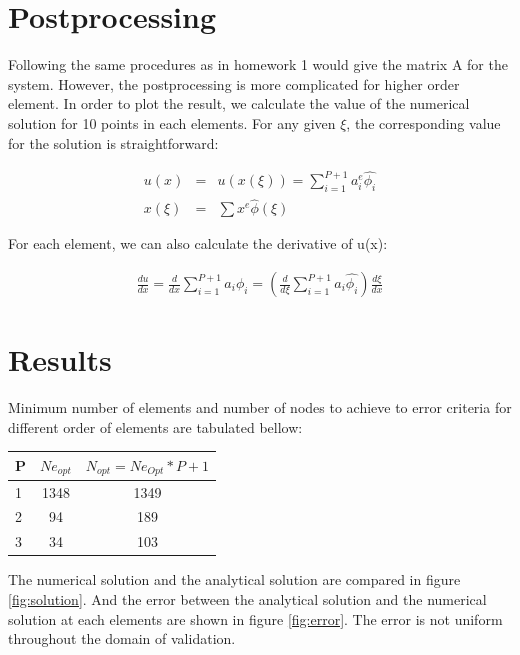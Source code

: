 \documentclass[paper=a4, fontsize=11pt]{article} %
\begin{document}
\section{Postprocessing}
Following the same procedures as in homework 1 would give the matrix A for the system. However, the postprocessing is more complicated for higher order element. In order to plot the result, we calculate the value of the numerical solution for 10 points in each elements. For any given $\xi$, the corresponding value for the solution is straightforward:

\begin{eqnarray}
 u(x) &=& u(x(\xi))=\sum_{i=1}^{P+1} a_i^e \hat{\phi_i}\nonumber\\
 x(\xi) &=& \sum x^e \hat{\phi}(\xi)
 \end{eqnarray} 

For each element, we can also calculate the derivative of u(x):

\begin{eqnarray}
\frac{du}{dx} = \frac{d}{dx} \sum_{i=1}^{P+1} a_i \phi_i = (\frac{d}{d\xi}\sum_{i=1}^{P+1} a_i \hat{\phi_i})\frac{d\xi}{dx}
\end{eqnarray}

\section{Results}

Minimum number of elements and number of nodes to achieve to error criteria for different order of elements are tabulated bellow: 

\begin{center}
  \begin{tabular}{ l | c | c}
    \hline
    P & $Ne_{opt}$ & $N_{opt} = Ne_{Opt} * P + 1 $\\ \hline
    1 & 1348 & 1349\\ \hline
    2 &  94 & 189\\ \hline
    3 & 34 & 103\\ \hline
    \hline
  \end{tabular}
\end{center}

The numerical solution and the analytical solution are compared in figure \ref{fig:solution}. And the error between the analytical solution and the numerical solution at each elements are shown in figure \ref{fig:error}. The error is not uniform throughout the domain of validation. 
\end{document}
